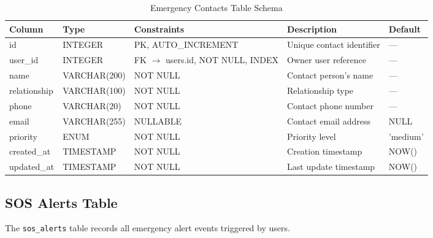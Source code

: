 \begin{table}[H]
  \centering
  \caption{Emergency Contacts Table Schema}
  \label{tab:schema-contacts}
  \begin{tabularx}{\textwidth}{@{}l l l X l@{}}
    \toprule
    \textbf{Column} & \textbf{Type} & \textbf{Constraints} & \textbf{Description} & \textbf{Default} \\
    \midrule
    id & INTEGER & PK, AUTO\_INCREMENT & Unique contact identifier & --- \\
    user\_id & INTEGER & FK $\to$ users.id, NOT NULL, INDEX & Owner user reference & --- \\
    name & VARCHAR(200) & NOT NULL & Contact person's name & --- \\
    relationship & VARCHAR(100) & NOT NULL & Relationship type & --- \\
    phone & VARCHAR(20) & NOT NULL & Contact phone number & --- \\
    email & VARCHAR(255) & NULLABLE & Contact email address & NULL \\
    priority & ENUM & NOT NULL & Priority level & 'medium' \\
    created\_at & TIMESTAMP & NOT NULL & Creation timestamp & NOW() \\
    updated\_at & TIMESTAMP & NOT NULL & Last update timestamp & NOW() \\
    \bottomrule
  \end{tabularx}
\end{table}

\subsection{SOS Alerts Table}

The \texttt{sos\_alerts} table records all emergency alert events triggered by users.

